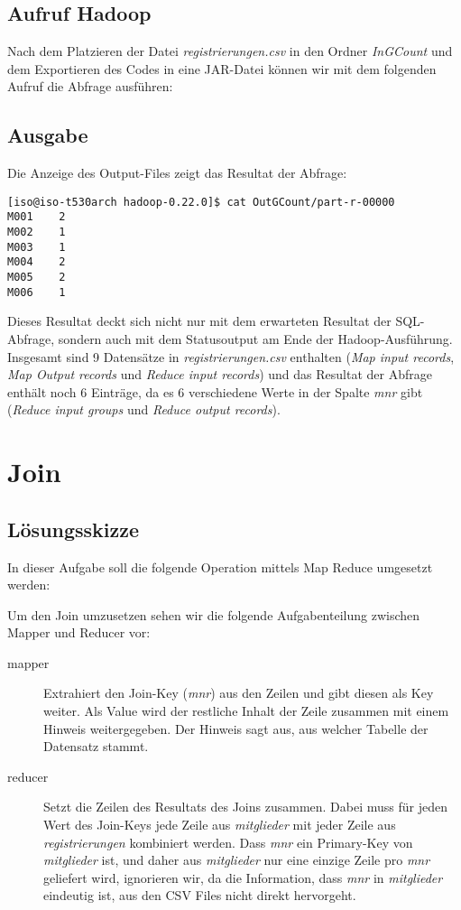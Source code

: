 \documentclass[11pt,a4paper,parskip=half]{scrartcl}
\begin{document}
\subsection{Aufruf Hadoop}
Nach dem Platzieren der Datei \emph{registrierungen.csv} in den Ordner \emph{InGCount} und dem Exportieren des Codes in eine JAR-Datei können wir mit dem folgenden Aufruf die Abfrage ausführen:


\subsection{Ausgabe}
Die Anzeige des Output-Files zeigt das Resultat der Abfrage:
\begin{lstlisting}
[iso@iso-t530arch hadoop-0.22.0]$ cat OutGCount/part-r-00000 
M001	2
M002	1
M003	1
M004	2
M005	2
M006	1
\end{lstlisting}

Dieses Resultat deckt sich nicht nur mit dem erwarteten Resultat der SQL-Abfrage, sondern auch mit dem Statusoutput am Ende der Hadoop-Ausführung. Insgesamt sind 9 Datensätze in \emph{registrierungen.csv} enthalten (\emph{Map input records}, \emph{Map Output records} und \emph{Reduce input records}) und das Resultat der Abfrage enthält noch 6 Einträge, da es 6 verschiedene Werte in der Spalte \emph{mnr} gibt (\emph{Reduce input groups} und \emph{Reduce output records}).


\newpage
\section{Join}
\subsection{Lösungsskizze}
In dieser Aufgabe soll die folgende Operation mittels Map Reduce umgesetzt werden:


Um den Join umzusetzen sehen wir die folgende Aufgabenteilung zwischen Mapper und Reducer vor:
\begin{description}
	\item[mapper]	Extrahiert den Join-Key (\emph{mnr}) aus den Zeilen und gibt diesen als Key weiter. Als Value wird der restliche Inhalt der Zeile zusammen mit einem Hinweis weitergegeben. Der Hinweis sagt aus, aus welcher Tabelle der Datensatz stammt.
	\item[reducer]	Setzt die Zeilen des Resultats des Joins zusammen. Dabei muss für jeden Wert des Join-Keys jede Zeile aus \emph{mitglieder} mit jeder Zeile aus \emph{registrierungen} kombiniert werden. Dass \emph{mnr} ein Primary-Key von \emph{mitglieder} ist, und daher aus \emph{mitglieder} nur eine einzige Zeile pro \emph{mnr} geliefert wird, ignorieren wir, da die Information, dass \emph{mnr} in \emph{mitglieder} eindeutig ist, aus den CSV Files nicht direkt hervorgeht.
\end{description}
\end{document}

